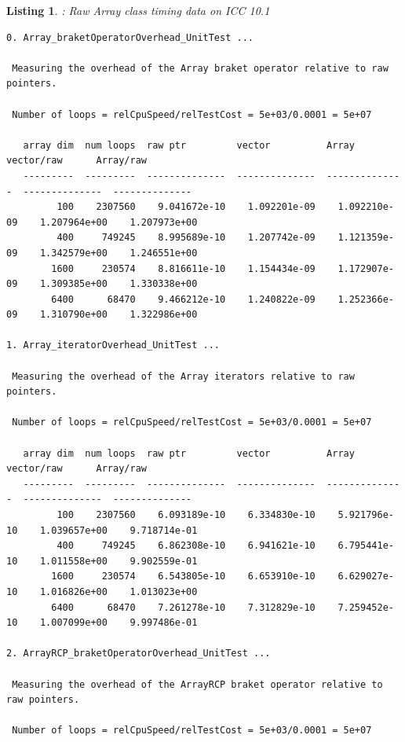 \documentclass[pdf,ps2pdf,11pt]{SANDreport}
\newtheorem{listing}{Listing}
\begin{document}
\pagebreak

\begin{listing}: Raw Array class timing data on ICC 10.1  \\
\label{listing:Array-ICC-Timings}
{\scriptsize\begin{verbatim}
0. Array_braketOperatorOverhead_UnitTest ... 
 
 Measuring the overhead of the Array braket operator relative to raw pointers.
 
 Number of loops = relCpuSpeed/relTestCost = 5e+03/0.0001 = 5e+07
 
   array dim  num loops  raw ptr         vector          Array           vector/raw      Array/raw     
   ---------  ---------  --------------  --------------  --------------  --------------  --------------
         100    2307560    9.041672e-10    1.092201e-09    1.092210e-09    1.207964e+00    1.207973e+00
         400     749245    8.995689e-10    1.207742e-09    1.121359e-09    1.342579e+00    1.246551e+00
        1600     230574    8.816611e-10    1.154434e-09    1.172907e-09    1.309385e+00    1.330338e+00
        6400      68470    9.466212e-10    1.240822e-09    1.252366e-09    1.310790e+00    1.322986e+00

1. Array_iteratorOverhead_UnitTest ... 
 
 Measuring the overhead of the Array iterators relative to raw pointers.
 
 Number of loops = relCpuSpeed/relTestCost = 5e+03/0.0001 = 5e+07
 
   array dim  num loops  raw ptr         vector          Array           vector/raw      Array/raw     
   ---------  ---------  --------------  --------------  --------------  --------------  --------------
         100    2307560    6.093189e-10    6.334830e-10    5.921796e-10    1.039657e+00    9.718714e-01
         400     749245    6.862308e-10    6.941621e-10    6.795441e-10    1.011558e+00    9.902559e-01
        1600     230574    6.543805e-10    6.653910e-10    6.629027e-10    1.016826e+00    1.013023e+00
        6400      68470    7.261278e-10    7.312829e-10    7.259452e-10    1.007099e+00    9.997486e-01

2. ArrayRCP_braketOperatorOverhead_UnitTest ... 
 
 Measuring the overhead of the ArrayRCP braket operator relative to raw pointers.
 
 Number of loops = relCpuSpeed/relTestCost = 5e+03/0.0001 = 5e+07
 

\end{verbatim}}
\end{listing}
\end{document}
